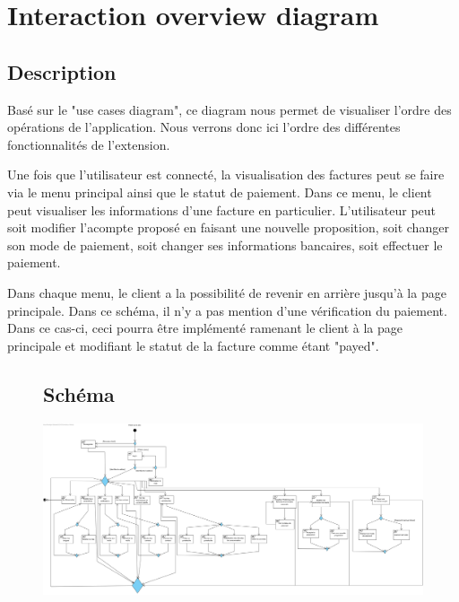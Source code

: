 \section{Interaction overview diagram}
\subsection{Description}

\begin{flushleft}
Basé sur le "use cases diagram", ce diagram nous permet de visualiser l'ordre des opérations de l'application. Nous verrons donc ici l'ordre des différentes fonctionnalités de l'extension.
\end{flushleft}

\begin{flushleft}
Une fois que l'utilisateur est connecté, la visualisation des factures peut se faire via le menu principal ainsi que le statut de paiement. Dans ce menu, le client peut visualiser les informations d'une facture en particulier.
L'utilisateur peut soit modifier l'acompte proposé en faisant une nouvelle proposition, soit changer son mode de paiement, soit changer ses informations bancaires, soit effectuer le paiement.
\end{flushleft}

\begin{flushleft}
Dans chaque menu, le client a la possibilité de revenir en arrière jusqu'à la page principale. Dans ce schéma, il n'y a pas mention d'une vérification du paiement. Dans ce cas-ci, ceci pourra être implémenté ramenant le client à la page principale et modifiant le statut de la facture comme étant "payed".
\end{flushleft}

\begin{figure}[h]
\subsection{Schéma}
\centering
\includegraphics[width = 1\textwidth]{extension-maxime/interaction/img/interaction-extension.png}
\end{figure}

